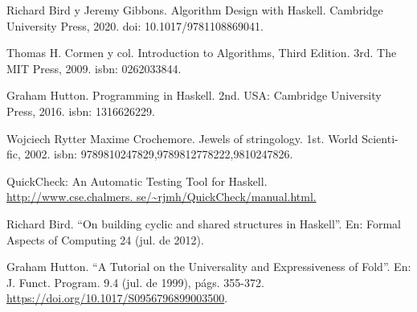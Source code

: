 \documentclass[letterpaper,11pt]{article}
\begin{document}
\begin{enumerate}[label={[\arabic*]}]
\item Richard Bird y Jeremy Gibbons. Algorithm Design with Haskell. Cambridge University Press,
2020. doi: 10.1017/9781108869041.
\item Thomas H. Cormen y col. Introduction to Algorithms, Third Edition. 3rd. The MIT Press,
2009. isbn: 0262033844.
\item Graham Hutton. Programming in Haskell. 2nd. USA: Cambridge University Press, 2016.
isbn: 1316626229.
\item Wojciech Rytter Maxime Crochemore. Jewels of stringology. 1st. World Scienti- fic, 2002.
isbn: 9789810247829,9789812778222,9810247826.
\item QuickCheck: An Automatic Testing Tool for Haskell.\\
\url{http://www.cse.chalmers. se/~rjmh/QuickCheck/manual.html.}
\item Richard Bird. ``On building cyclic and shared structures in Haskell''. En: Formal Aspects of
Computing 24 (jul. de 2012).
\item Graham Hutton. ``A Tutorial on the Universality and Expressiveness of Fold''.
En: J. Funct. Program. 9.4 (jul. de 1999), págs. 355-372.
\url{https://doi.org/10.1017/S0956796899003500}.

\end{enumerate}
\end{document}
